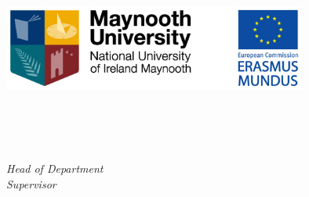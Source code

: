 
\begin{titlepage}

\begin{center}
\large

\hfill
\vspace*{14ex}

\begingroup
\color{Maroon}\spacedallcaps{\myTitle} \\ \bigskip %
\endgroup

\spacedlowsmallcaps{\myName} %

\vspace*{14ex}

\includegraphics[width=10cm]{gfx/mu_em} \\

\vspace*{8ex}

\mySubtitle \\ \medskip %
\myDegree \\
\myDepartment \\
\myUni

\bigskip

\emph{Head of Department} \mySupervisor \\
\emph{Supervisor} \mySupervisor


\vfill


\end{center}

\end{titlepage}
